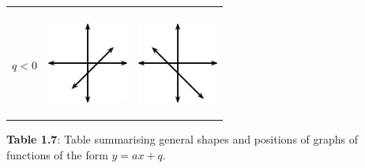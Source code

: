 \begin{center}
\begin{xtabular*}{\mytablewidth}[t]{|p{10\mystarwidth}|p{10\mystarwidth}|p{10\mystarwidth}|}
\begin{center}
\vspace{2pt}
\vspace{.1in}
\end{center}    
\tabularnewline{}
    $q<0$
    &
\setcounter{subfigure}{0}
\label{m39338*id238353}
\begin{center}
\label{m39338*id238353!!!underscore!!!media}\label{m39338*id238353!!!underscore!!!printimage}\includegraphics[width=100px]{col11306.imgs/m39338_MG10C11_008.png} %
\vspace{2pt}
\vspace{.1in}
\end{center}    
    &
\setcounter{subfigure}{0}
\label{m39338*id238365}
\begin{center}
\label{m39338*id238365!!!underscore!!!media}\label{m39338*id238365!!!underscore!!!printimage}\includegraphics[width=100px]{col11306.imgs/m39338_MG10C11_009.png} %
\vspace{2pt}
\vspace{.1in}
\end{center}    
\tabularnewline{}
\end{xtabular*}
\end{center}
\begin{center}{\small\bfseries Table 1.7}: Table summarising general shapes and positions of graphs of functions of the form $y=ax+q$.\end{center}
\par

